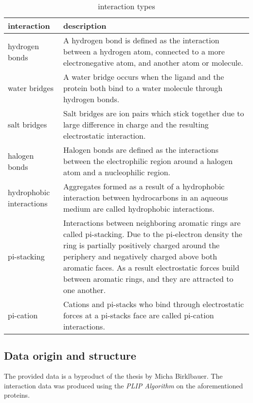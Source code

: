 \begin{table}[h!]
    \centering
\begin{tabular}{ | m{10em} | m{30em}| } 
    \hline
    \textbf{interaction} &\textbf{description\cite[]{Birklbauer2021}}
    \\
    \hline
    hydrogen bonds& A hydrogen bond is defined as the interaction between a 
    hydrogen atom, connected to a more electronegative atom, and another atom or molecule. \\
    \hline
    water bridges   &A water bridge occurs when the ligand and the protein
    both bind to a water molecule through hydrogen bonds.\\
    \hline
    salt bridges&  Salt bridges are ion pairs which stick together due to
    large difference in charge and the resulting electrostatic interaction. \\
    \hline
    halogen bonds&  Halogen bonds are defined as the interactions between the electrophilic region
    around a halogen atom and a nucleophilic region.\\
    \hline
    hydrophobic interactions& Aggregates formed as a result
    of a hydrophobic interaction between hydrocarbons in an 
    aqueous medium are called hydrophobic interactions.\\
    \hline
    pi-stacking   & Interactions between neighboring aromatic 
    rings are called pi-stacking. Due to the pi-electron density the ring is partially positively charged around 
    the periphery and negatively charged above both aromatic faces. As a result electrostatic forces build between aromatic rings,
     and they are attracted to one another.\\
    \hline
    pi-cation& Cations and pi-stacks who bind through electrostatic 
    forces at a pi-stacks face are called pi-cation interactions.\\
    \hline
   \end{tabular}
   \caption{interaction types}
\end{table}
    


\subsection{Data origin and structure} 
The provided data is a byproduct of the thesis \cite[]{Birklbauer2021} by Micha Birklbauer.
The interaction data was produced using the \textit{PLIP Algorithm} \cite[]{Salentin2015} 
on the aforementioned proteins.

